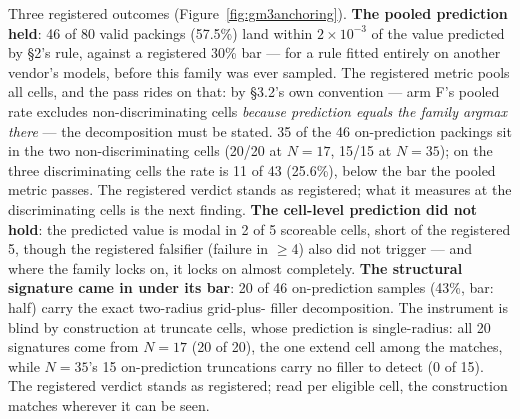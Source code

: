 Three registered outcomes (Figure~\ref{fig:gm3anchoring}). \textbf{The pooled prediction held}: 46 of 80 valid
packings (57.5\%) land within $2\times10^{-3}$ of the value predicted by \S2's rule, against a
registered 30\% bar --- for a rule fitted entirely on another vendor's models, before this
family was ever sampled. The registered metric pools all cells, and the pass rides on that:
by \S3.2's own convention --- arm F's pooled rate excludes non-discriminating cells \emph{because
prediction equals the family argmax there} --- the decomposition must be stated. 35 of the 46
on-prediction packings sit in the two non-discriminating cells (20/20 at $N = 17$, 15/15 at
$N = 35$); on the three discriminating cells the rate is 11 of 43 (25.6\%), below the bar the
pooled metric passes. The registered verdict stands as registered; what it measures at the
discriminating cells is the next finding. \textbf{The cell-level prediction did not hold}: the
predicted value is modal in 2 of 5 scoreable cells, short of the registered 5, though the
registered falsifier (failure in $\ge$4) also did not trigger --- and where the family locks on,
it locks on almost completely. \textbf{The structural signature came in under its
bar}: 20 of 46 on-prediction samples (43\%, bar: half) carry the exact two-radius grid-plus-
filler decomposition. The instrument is blind by construction at truncate cells, whose prediction is single-radius: all 20 signatures come from $N = 17$ (20 of 20), the one extend cell among the matches, while $N = 35$'s 15 on-prediction truncations carry no filler to detect (0 of 15). The registered verdict stands as registered; read per eligible cell, the construction matches wherever it can be seen.

